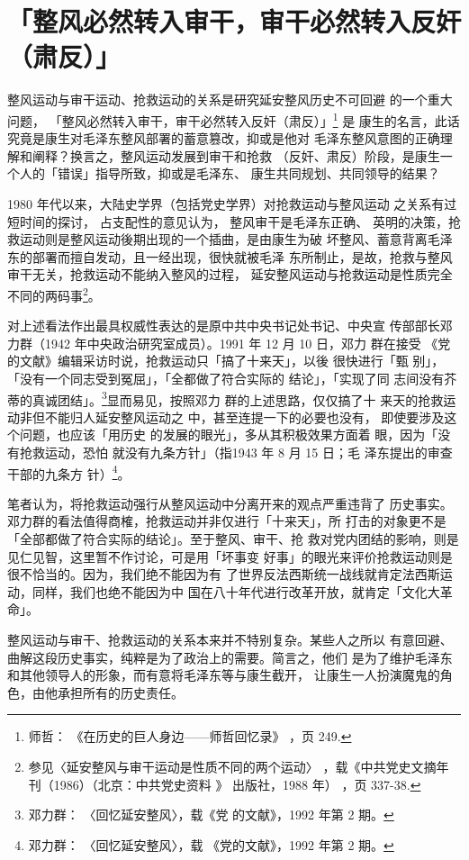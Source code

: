 \section{「整风必然转入审干，审干必然转入反奸（肃反）」}
整风运动与审干运动、抢救运动的关系是研究延安整风历史不可回避
的一个重大问题，
「整风必然转入审干，审干必然转入反奸（肃反）」\footnote{师哲：
《在历史的巨人身边——师哲回忆录》
，页 249.} 是
康生的名言，此话究竟是康生对毛泽东整风部署的蓄意篡改，抑或是他对
毛泽东整风意图的正确理解和阐释？换言之，整风运动发展到审干和抢救
（反奸、肃反）阶段，是康生一个人的「错误」指导所致，抑或是毛泽东、
康生共同规划、共同领导的结果？

1980 年代以来，大陆史学界（包括党史学界）对抢救运动与整风运动
之关系有过短时间的探讨，
占支配性的意见认为，
整风审干是毛泽东正确、
英明的决策，抢救运动则是整风运动後期出现的一个插曲，是由康生为破
坏整风、蓄意背离毛泽东的部署而擅自发动，且一经出现，很快就被毛泽
东所制止，是故，抢救与整风审干无关，抢救运动不能纳入整风的过程，
延安整风运动与抢救运动是性质完全不同的两码事\footnote{ 参见〈延安整风与审干运动是性质不同的两个运动〉
，载《中共党史文摘年刊（1986）（北京：中共党史资料
》
出版社，1988 年）
，页 337-38.}。

对上述看法作出最具权威性表达的是原中共中央书记处书记、中央宣 传部部长邓
力群（1942 年中央政治研究室成员）。1991 年 12 月 10 日，邓力 群在接受
《党的文献》编辑采访时说，抢救运动只「搞了十来天」，以後 很快进行「甄
别」，「没有一个同志受到冤屈」，「全都做了符合实际的 结论」，「实现了同
志间没有芥蒂的真诚团结」。\footnote{邓力群： 〈回忆延安整风〉，载《党
的文献》，1992 年第 2 期。}显而易见，按照邓力 群的上述思路，仅仅搞了十
来天的抢救运动非但不能归人延安整风运动之 中，甚至连提一下的必要也没有，
即使要涉及这个问题，也应该「用历史 的发展的眼光」，多从其积极效果方面着
眼，因为「没有抢救运动，恐怕 就没有九条方针」（指1943 年 8 月 15 日；毛
泽东提出的审查干部的九条方 针）\footnote{邓力群： 〈回忆延安整风〉，载
《党的文献》，1992 年第 2 期。}。

笔者认为，将抢救运动强行从整风运动中分离开来的观点严重违背了
历史事实。邓力群的看法值得商榷，抢救运动并非仅进行「十来天」，所
打击的对象更不是「全部都做了符合实际的结论」。至于整风、审干、抢
救对党内团结的影响，则是见仁见智，这里暂不作讨论，可是用「坏事变
好事」的眼光来评价抢救运动则是很不恰当的。因为，我们绝不能因为有
了世界反法西斯统一战线就肯定法西斯运动，同样，我们也绝不能因为中
国在八十年代进行改革开放，就肯定「文化大革命」。

整风运动与审干、抢救运动的关系本来并不特别复杂。某些人之所以
有意回避、曲解这段历史事实，纯粹是为了政治上的需要。简言之，他们
是为了维护毛泽东和其他领导人的形象，而有意将毛泽东等与康生截开，
让康生一人扮演魔鬼的角色，由他承担所有的历史责任。

